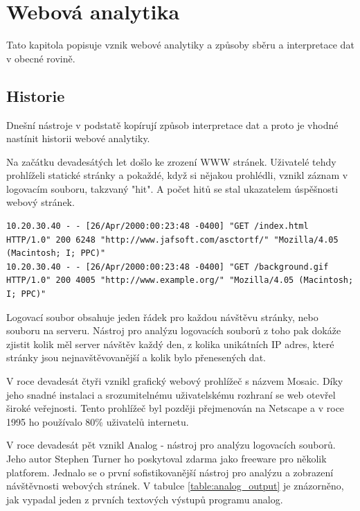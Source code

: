 \documentclass[bc,male,java,dept456]{diploma}						%
\begin{document}
\section{Webová analytika}

Tato kapitola popisuje vznik webové analytiky a způsoby sběru a interpretace dat v obecné rovině. 



\subsection{Historie}


Dnešní nástroje v podstatě kopírují způsob interpretace dat a proto je vhodné nastínit historii webové analytiky.

Na začátku devadesátých let došlo ke zrození WWW stránek. Uživatelé tehdy pro\-hlí\-želi statické stránky a pokaždé, když si nějakou prohlédli, vznikl záznam v logovacím souboru, takzvaný "hit". A počet hitů se stal ukazatelem úspěšnosti webový stránek.

\bigskip

\begin{lstlisting}[label=src:Plain,caption=Ukázka záznamu z logovacího souboru]
10.20.30.40 - - [26/Apr/2000:00:23:48 -0400] "GET /index.html HTTP/1.0" 200 6248 "http://www.jafsoft.com/asctortf/" "Mozilla/4.05 (Macintosh; I; PPC)"
10.20.30.40 - - [26/Apr/2000:00:23:48 -0400] "GET /background.gif HTTP/1.0" 200 4005 "http://www.example.org/" "Mozilla/4.05 (Macintosh; I; PPC)"
\end{lstlisting}

\bigskip

Logovací soubor obsahuje jeden řádek pro každou návštěvu stránky, nebo souboru na serveru. Nástroj pro analýzu logovacích souborů z toho pak dokáže zjistit kolik měl server návštěv každý den, z kolika unikátních IP adres, které stránky jsou nej\-na\-vště\-vo\-va\-něj\-ší a kolik bylo přenesených dat.

V roce devadesát čtyři vznikl grafický webový prohlížeč s názvem Mosaic. Díky jeho snadné instalaci a srozumitelnému uživatelskému rozhraní se web otevřel široké veřejnosti. Tento prohlížeč byl později přejmenován na Netscape a v roce 1995 ho po\-u\-ží\-va\-lo 80\% uživatelů internetu.

V roce devadesát pět vznikl Analog - nástroj pro analýzu logovacích souborů. Jeho autor Stephen Turner ho poskytoval zdarma jako freeware pro několik platforem. Jednalo se o první sofistikovanější nástroj pro analýzu a zobrazení návštěvnosti webových stránek. V tabulce \ref{table:analog_output} je znázorněno, jak vypadal jeden z prvních textových výstupů programu analog.
\end{document}
